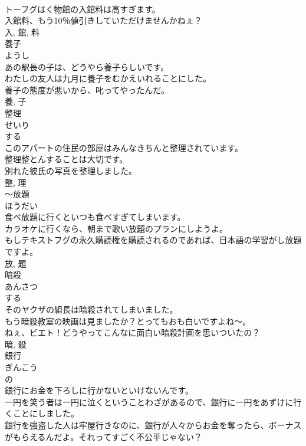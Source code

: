 \documentclass[8pt]{extreport}
\begin{document}
\begin{CJK}{UTF8}{min}
\\	トーフグはく物館の入館料は高すぎます。	
\\	入館料、もう10％値引きしていただけませんかねぇ？	
\\	入, 館, 料	
\\	養子	
\\	ようし	
\\	あの駅長の子は、どうやら養子らしいです。	
\\	わたしの友人は九月に養子をむかえいれることにした。	
\\	養子の態度が悪いから、叱ってやったんだ。	
\\	養, 子	
\\	整理	
\\	せいり	
\\	する 
\\	このアパートの住民の部屋はみんなきちんと整理されています。	
\\	整理整とんすることは大切です。	
\\	別れた彼氏の写真を整理しました。	
\\	整, 理	
\\	〜放題	
\\	ほうだい	
\\	食べ放題に行くといつも食べすぎてしまいます。	
\\	カラオケに行くなら、朝まで歌い放題のプランにしようよ。	
\\	もしテキストフグの永久購読権を購読されるのであれば、日本語の学習がし放題ですよ。	
\\	放, 題	
\\	暗殺	
\\	あんさつ	
\\	する 
\\	そのヤクザの組長は暗殺されてしまいました。	
\\	もう暗殺教室の映画は見ましたか？とってもおも白いですよね〜。	
\\	ねぇ、ビエト！どうやってこんなに面白い暗殺計画を思いついたの？	
\\	暗, 殺	
\\	銀行	
\\	ぎんこう	
\\	の 
\\	銀行にお金を下ろしに行かないといけないんです。	
\\	一円を笑う者は一円に泣くということわざがあるので、銀行に一円をあずけに行くことにしました。	
\\	銀行を強盗した人は牢屋行きなのに、銀行が人々からお金を奪ったら、ボーナスがもらえるんだよ。それってすごく不公平じゃない？	

\end{CJK}
\end{document}
